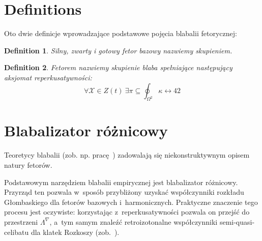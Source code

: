 \documentclass[licencjacka,en]{pracamgr}
\newtheorem{defi}{Definition}[section]
\begin{document}
\section{Definitions}

Oto dwie definicje wprowadzające podstawowe pojęcia blabalii
fetorycznej:

\begin{defi}\label{skupienie}
  Silny, zwarty i gotowy fetor bazowy nazwiemy \emph{skupieniem}.
\end{defi}

\begin{defi}\label{fetor}
  \emph{Fetorem} nazwiemy skupienie blaba spełniające następujący
  \emph{aksjomat reperkusatywności}:
  $$\forall \mathcal{X}\in Z(t)\ \exists
    \pi\subseteq\oint_{\Omega^2}\kappa\leftrightarrow 42$$
\end{defi}


\section{Blabalizator różnicowy}

Teoretycy blabalii (zob. np. pracę~\cite{grglo}) zadowalają się
niekonstruktywnym opisem natury fetorów.

Podstawowym narzędziem blabalii empirycznej jest blabalizator
różnicowy.  Przyrząd ten pozwala w~sposób przybliżony uzyskać
współczynniki rozkładu Głombaskiego dla fetorów bazowych
i~harmonicznych.  Praktyczne znaczenie tego procesu jest oczywiste:
korzystając z~reperkusatywności pozwala on przejść do przestrzeni
$\Lambda^{\nabla}$, a~tym samym znaleźć retroizotonalne współczynniki
semi-quasi-celibatu dla klatek Rozkoszy (zob.~\cite{JR}).
\end{document}
